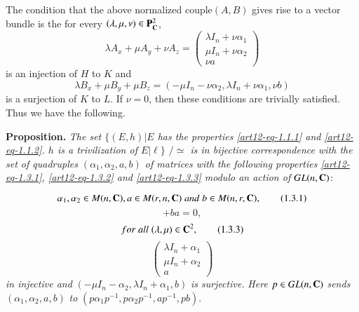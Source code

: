 The condition that the above normalized couple$(A, B)$ gives rise to a vector bundle is the for every $(\lambda, \mu, \nu) \in \mathbf{P}_{\mathbf{C}}^{2}$,
$$
\lambda A_{x}+ \mu A_{y} + \nu A_{z} = \begin{pmatrix}
\lambda I_{n} + \nu \alpha_{1}\\
\mu I_{n} +\nu\alpha_{2}\\
\nu a
\end{pmatrix}
$$
is an injection of $H$ to $K$ and
$$
\lambda B_{x} + \mu B_{y} + \mu B_{z} =(-\mu I_{n}-\nu \alpha_{2},\lambda I_{n} +\nu\alpha_{1}, \nu b)
$$
is a surjection of $K$ to $L$. If $\nu =0$, then these conditions are trivially satisfied. Thus we have the following.

\medskip
\noindent
{\bfseries {} Proposition.\label{art12-prop-1.3}} \textit{The set $\{(E, h) | E$ {\rm has the
properties} \eqref{art12-eq-1.1.1} {\rm and} \eqref{art12-eq-1.1.2}. $h$ {\rm is a trivilization of} $E|\ell\}$ $/\simeq$ is in bijective correspondence with the set of quadruples $(\alpha_{1}, \alpha_{2}, a,b)$ of matrices with the following properties \eqref{art12-eq-1.3.1}, \eqref{art12-eq-1.3.2} and \eqref{art12-eq-1.3.3} modulo an action of $GL(n, \mathbf{C})$}:

\begin{equation}
\alpha_{1}, \alpha_{2} \in M (n, \mathbf{C}), a \in M (r, n, \mathbf{C}) \;and\; b\in M(n,r, \mathbf{C}), \tag{1.3.1}\label{art12-eq-1.3.1}
\end{equation}
\begin{equation}
[\alpha_{1}, \alpha_{2}] + ba =0,\tag{1.3.2}\label{art12-eq-1.3.2}
\end{equation}
\begin{equation}
for \; all  \;(\lambda, \mu) \in \mathbf{C}^{2},\tag{1.3.3}\label{art12-eq-1.3.3}
\end{equation}
$$
\begin{pmatrix}
\lambda I_{n} + \alpha_{1}\\
\mu I_{n} + \alpha_{2}\\
a
\end{pmatrix}
$$
\textit{in injective and} $(-\mu I_{n}-\alpha_{2}, \lambda I_{n} + \alpha_{1}, b)$ \textit{is surjective.}
\textit{Here} $p \in GL(n, \mathbf{C})$ \textit{sends} $(\alpha_{1}, \alpha_{2}, a, b)$ \textit{to} $(p\alpha_{1}p^{-1}, p\alpha_{2}p^{-1}, ap^{-1}, pb)$.

